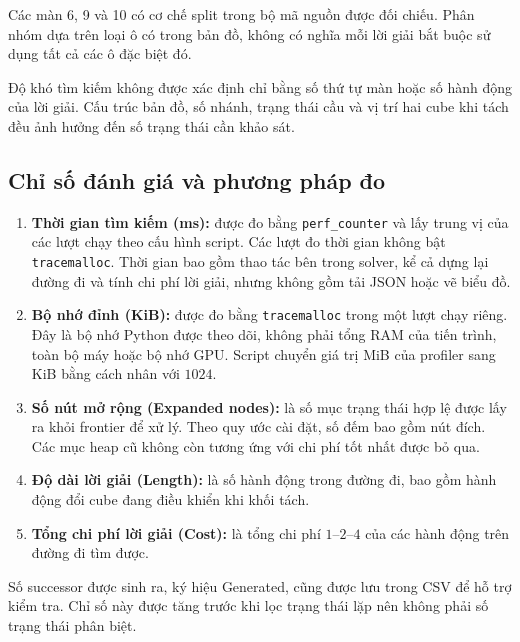 Các màn 6, 9 và 10 có cơ chế split trong bộ mã nguồn được
đối chiếu. Phân nhóm dựa trên loại ô có trong bản đồ,
không có nghĩa mỗi lời giải bắt buộc sử dụng tất cả các ô
đặc biệt đó.

Độ khó tìm kiếm không được xác định chỉ bằng số thứ tự màn
hoặc số hành động của lời giải. Cấu trúc bản đồ, số nhánh,
trạng thái cầu và vị trí hai cube khi tách đều ảnh hưởng
đến số trạng thái cần khảo sát.

\subsection{Chỉ số đánh giá và phương pháp đo}

\begin{enumerate}

\item \textbf{Thời gian tìm kiếm (ms):}
được đo bằng \texttt{perf\_counter} và lấy trung vị của các lượt chạy theo cấu hình script. Các lượt đo thời gian không bật
\texttt{tracemalloc}. Thời gian bao gồm thao tác bên trong
solver, kể cả dựng lại đường đi và tính chi phí lời giải,
nhưng không gồm tải JSON hoặc vẽ biểu đồ.

\item \textbf{Bộ nhớ đỉnh (KiB):}
được đo bằng \texttt{tracemalloc} trong một lượt chạy riêng.
Đây là bộ nhớ Python được theo dõi, không phải tổng RAM
của tiến trình, toàn bộ máy hoặc bộ nhớ GPU.
Script chuyển giá trị MiB của profiler sang KiB bằng cách
nhân với $1024$.

\item \textbf{Số nút mở rộng (Expanded nodes):}
là số mục trạng thái hợp lệ được lấy ra khỏi frontier
để xử lý. Theo quy ước cài đặt, số đếm bao gồm nút đích.
Các mục heap cũ không còn tương ứng với chi phí tốt nhất
được bỏ qua.

\item \textbf{Độ dài lời giải (Length):}
là số hành động trong đường đi, bao gồm hành động đổi cube
đang điều khiển khi khối tách.

\item \textbf{Tổng chi phí lời giải (Cost):}
là tổng chi phí $1$--$2$--$4$ của các hành động trên
đường đi tìm được.

\end{enumerate}

Số successor được sinh ra, ký hiệu Generated, cũng được lưu
trong CSV để hỗ trợ kiểm tra. Chỉ số này được tăng trước khi
lọc trạng thái lặp nên không phải số trạng thái phân biệt.

